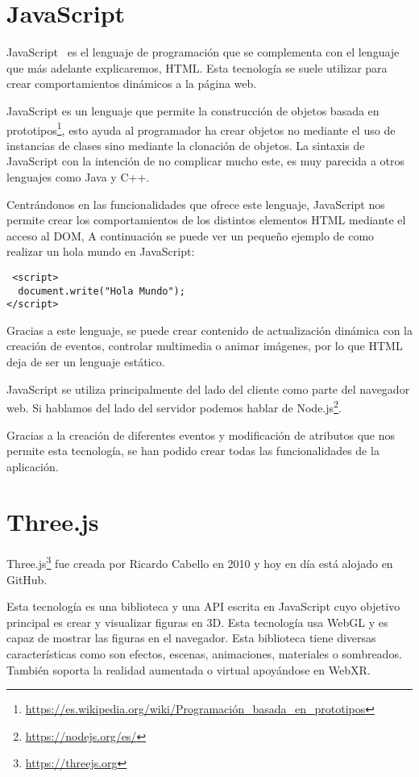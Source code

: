 \documentclass[a4paper, 12pt]{book}
\begin{document}
\section{JavaScript} %
\label{sec:JavaScript}

JavaScript~\cite{eloquent} es el lenguaje de programación que se complementa con el lenguaje que más adelante explicaremos, HTML. Esta tecnología se suele utilizar para crear comportamientos dinámicos a la página web.

JavaScript es un lenguaje que permite la construcción de objetos basada en prototipos\footnote{\url{https://es.wikipedia.org/wiki/Programación_basada_en_prototipos}}, esto ayuda al programador ha crear objetos no mediante el uso de  instancias de clases sino mediante la clonación de objetos. La sintaxis de JavaScript con la intención de no complicar mucho este, es muy parecida a otros lenguajes como Java y C++.

Centrándonos en las funcionalidades que ofrece este lenguaje, JavaScript nos permite crear los comportamientos de los distintos elementos  HTML mediante el acceso al DOM, A continuación se puede ver un pequeño ejemplo de como realizar un hola mundo en JavaScript:

\begin{verbatim}
 <script>
  document.write("Hola Mundo");
</script>   
\end{verbatim}

Gracias a este lenguaje, se puede crear contenido de actualización dinámica con la creación de eventos, controlar multimedia o animar imágenes, por lo que HTML deja de ser un lenguaje estático.

JavaScript se utiliza principalmente del lado del cliente como parte del navegador web. Si hablamos del lado del servidor podemos hablar de Node.js\footnote{\url{https://nodejs.org/es/}}.

Gracias a la creación de diferentes eventos y  modificación de atributos  que nos permite esta tecnología, se han podido crear todas las funcionalidades de la aplicación.

\section{Three.js} %
\label{sec:Three}
Three.js\footnote{\url{https://threejs.org}} fue creada por Ricardo Cabello en 2010 y hoy en día está alojado en GitHub.

Esta tecnología es una biblioteca y una API escrita en JavaScript cuyo objetivo principal es crear y visualizar figuras en 3D. Esta tecnología usa WebGL y es capaz de mostrar las figuras en el navegador. Esta biblioteca tiene diversas características como son efectos, escenas, animaciones, materiales o sombreados. También soporta la realidad aumentada o virtual apoyándose en WebXR.
\end{document}
